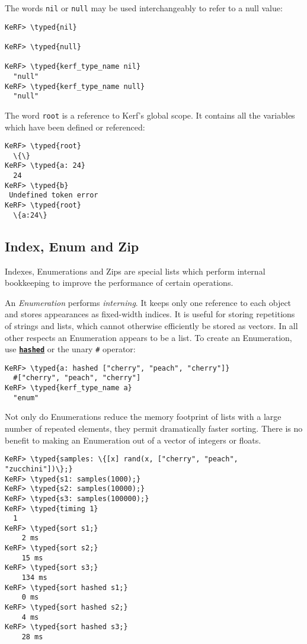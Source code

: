 \documentclass{article}
\newcommand{\typed}[1]{\textcolor{TealBlue}{#1}}
\newcommand{\primu}[2]{\hyperref[prim:#2]{\textbf{\texttt{#1}}}}
\newcommand{\prim}[1]{\primu{#1}{#1}}
\begin{document}
The words \texttt{nil} or \texttt{null} may be used interchangeably to refer to a null value:
\begin{Verbatim}
KeRF> \typed{nil}
  
KeRF> \typed{null}

KeRF> \typed{kerf_type_name nil}
  "null"
KeRF> \typed{kerf_type_name null}
  "null"
\end{Verbatim}

The word \texttt{root} is a reference to Kerf's global scope. It contains all the variables which have been defined or referenced:
\begin{Verbatim}
KeRF> \typed{root}
  \{\}
KeRF> \typed{a: 24}
  24
KeRF> \typed{b}
 Undefined token error
KeRF> \typed{root}
  \{a:24\}
\end{Verbatim}

\pagebreak
\subsection{Index, Enum and Zip}
Indexes, Enumerations and Zips are special lists which perform internal bookkeeping to improve the performance of certain operations.

\vspace{0.5cm}

An \emph{Enumeration} performs \emph{interning}. It keeps only one reference to each object and stores appearances as fixed-width indices. It is useful for storing repetitions of strings and lists, which cannot otherwise efficiently be stored as vectors. In all other respects an Enumeration appears to be a list. To create an Enumeration, use \prim{hashed} or the unary \texttt{\#} operator:
\begin{Verbatim}
KeRF> \typed{a: hashed ["cherry", "peach", "cherry"]}
  #["cherry", "peach", "cherry"]
KeRF> \typed{kerf_type_name a}
  "enum"
\end{Verbatim}
Not only do Enumerations reduce the memory footprint of lists with a large number of repeated elements, they permit dramatically faster sorting. There is no benefit to making an Enumeration out of a vector of integers or floats.
\begin{Verbatim}
KeRF> \typed{samples: \{[x] rand(x, ["cherry", "peach", "zucchini"])\};}
KeRF> \typed{s1: samples(1000);}
KeRF> \typed{s2: samples(10000);}
KeRF> \typed{s3: samples(100000);}
KeRF> \typed{timing 1}
  1
KeRF> \typed{sort s1;}
    2 ms
KeRF> \typed{sort s2;}
    15 ms
KeRF> \typed{sort s3;}
    134 ms
KeRF> \typed{sort hashed s1;}
    0 ms
KeRF> \typed{sort hashed s2;}
    4 ms
KeRF> \typed{sort hashed s3;}
    28 ms
\end{Verbatim}
\end{document}
